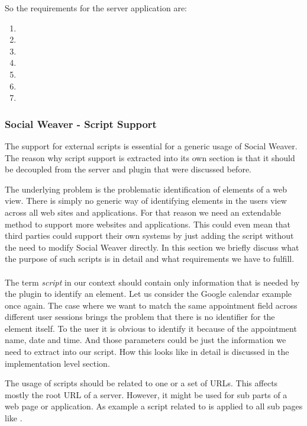 So the requirements for the server application are:
\begin{enumerate}
\item \reqWSi
\item \reqWSii
\item \reqWSiii
\item \reqWSiv
\item \reqWSv
\item \reqWSvi
\item \reqWSvii
\end{enumerate}

\subsubsection{Social Weaver - Script Support} \label{abstract-script-support-reqs}
The support for external scripts is essential for a generic usage of Social Weaver. The reason why script support is extracted into its own section is that it should be decoupled from the server and plugin that were discussed before. 

The underlying problem is the problematic identification of elements of a web view. There is simply no generic way of identifying elements in the users view across all web sites and applications. For that reason we need an extendable method to support more websites and applications. This could even mean that third parties could support their own systems by just adding the script without the need to modify Social Weaver directly. In this section we briefly discuss what the purpose of such scripts is in detail and what requirements we have to fulfill. 
\\ \\
The term \textit{script} in our context should contain only information that is needed by the plugin to identify an element. Let us consider the Google calendar example once again. The case where we want to match the same appointment field across different user sessions brings the problem that there is no identifier for the element itself. To the user it is obvious to identify it because of the appointment name, date and time. And those parameters could be just the information we need to extract into our script. How this looks like in detail is discussed in the implementation level section. 

The usage of scripts should be related to one or a set of URLs. This affects mostly the root URL of a server. However, it might be used for sub parts of a web page or application. As example a script related to  is applied to all sub pages like . 

